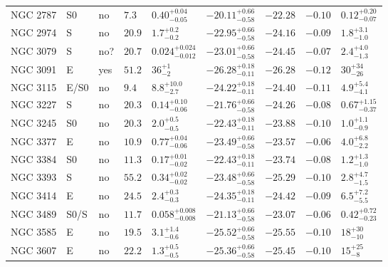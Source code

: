 \begin{table*}
\begin{center}
\begin{tabular}{lllllllll}
NGC 2787  &  S0  &  no   &  $7.3$  &  $0.40_{-0.05}^{+0.04}$   &  $-20.11_{-0.58}^{+0.66}$   &  $-22.28$   &  $-0.10$  &  $0.12_{-0.07}^{+0.20}$   \\ 
NGC 2974  &  S  &  no   &  $20.9$  &  $1.7_{-0.2}^{+0.2}$   &  $-22.95_{-0.58}^{+0.66}$   &  $-24.16$   &  $-0.09$  &  $1.8_{-1.0}^{+3.1}$   \\ 
NGC 3079  &  S  &  no?  &  $20.7$  &  $0.024_{-0.012}^{+0.024}$   &  $-23.01_{-0.58}^{+0.66}$   &  $-24.45$   &  $-0.07$  &  $2.4_{-1.3}^{+4.0}$   \\ 
NGC 3091  &  E  &  yes   &  $51.2$  &  $36_{-2}^{+1}$   &  $-26.28_{-0.11}^{+0.18}$   &  $-26.28$   &  $-0.12$  &  $30_{-26}^{+34}$   \\ 
NGC 3115  &  E/S0  &  no   &  $9.4$  &  $8.8_{-2.7}^{+10.0}$   &  $-24.22_{-0.11}^{+0.18}$   &  $-24.40$   &  $-0.11$  &  $4.9_{-4.1}^{+5.4}$   \\ 
NGC 3227  &  S  &  no   &  $20.3$  &  $0.14_{-0.06}^{+0.10}$   &  $-21.76_{-0.58}^{+0.66}$   &  $-24.26$   &  $-0.08$  &  $0.67_{-0.37}^{+1.15}$   \\ 
NGC 3245  &  S0  &  no   &  $20.3$  &  $2.0_{-0.5}^{+0.5}$   &  $-22.43_{-0.11}^{+0.18}$   &  $-23.88$   &  $-0.10$  &  $1.0_{-0.9}^{+1.1}$   \\ 
NGC 3377  &  E  &  no   &  $10.9$  &  $0.77_{-0.06}^{+0.04}$   &  $-23.49_{-0.58}^{+0.66}$   &  $-23.57$   &  $-0.06$  &  $4.0_{-2.2}^{+6.8}$   \\ 
NGC 3384  &  S0  &  no   &  $11.3$  &  $0.17_{-0.02}^{+0.01}$   &  $-22.43_{-0.11}^{+0.18}$   &  $-23.74$   &  $-0.08$  &  $1.2_{-1.0}^{+1.3}$   \\ 
NGC 3393  &  S  &  no   &  $55.2$  &  $0.34_{-0.02}^{+0.02}$   &  $-23.48_{-0.58}^{+0.66}$   &  $-25.29$   &  $-0.10$  &  $2.8_{-1.5}^{+4.7}$   \\ 
NGC 3414  &  E  &  no   &  $24.5$  &  $2.4_{-0.3}^{+0.3}$   &  $-24.35_{-0.11}^{+0.18}$   &  $-24.42$   &  $-0.09$  &  $6.5_{-5.5}^{+7.2}$   \\ 
NGC 3489  &  S0/S  &  no   &  $11.7$  &  $0.058_{-0.008}^{+0.008}$   &  $-21.13_{-0.58}^{+0.66}$   &  $-23.07$   &  $-0.06$  &  $0.42_{-0.23}^{+0.72}$   \\ 
NGC 3585  &  E  &  no   &  $19.5$  &  $3.1_{-0.6}^{+1.4}$   &  $-25.52_{-0.58}^{+0.66}$   &  $-25.55$   &  $-0.10$  &  $18_{-10}^{+30}$   \\ 
NGC 3607  &  E  &  no   &  $22.2$  &  $1.3_{-0.5}^{+0.5}$   &  $-25.36_{-0.58}^{+0.66}$   &  $-25.45$   &  $-0.10$  &  $15_{-8}^{+25}$   \\ 

\end{tabular}
\end{center}
\end{table*}

